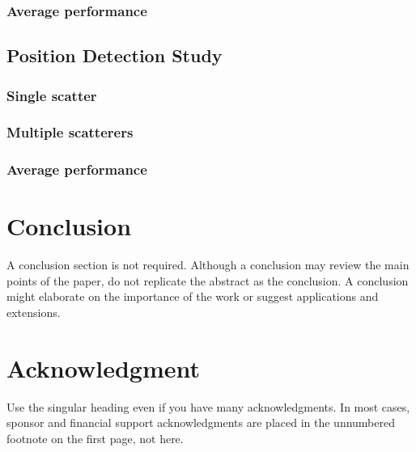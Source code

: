 \documentclass{IEEEtran}
\begin{document}
			\subsubsection{Average performance}\label{sec:results:shape:average}
		
		\subsection{Position Detection Study}\label{sec:results:position}
		
			\subsubsection{Single scatter}\label{sec:results:position:single}
			
			\subsubsection{Multiple scatterers}\label{sec:results:position:multiple}
			
			\subsubsection{Average performance}\label{sec:results:position:benchmark}
    
    \section{Conclusion}\label{sec:conclusion}
        A conclusion section is not required. Although a conclusion may review the main points of the paper, do not replicate the abstract as the conclusion. A  conclusion might elaborate on the importance of the work or suggest applications and extensions. \cite{chen2018computational}
    
    \appendices
    
    \section*{Acknowledgment}
    
        Use the singular heading even if you have many acknowledgments. In most  cases, sponsor and financial support acknowledgments are placed in the  unnumbered footnote on the first page, not here.
    
    
    
    
        
\end{document}

